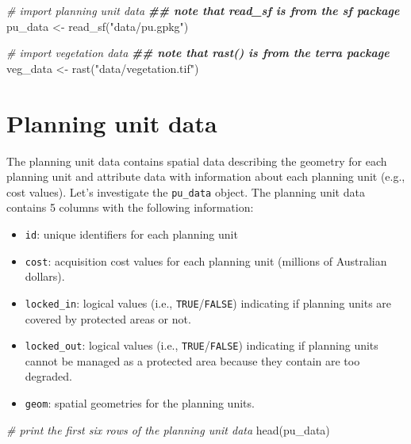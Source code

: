 \documentclass[
  12pt,
]{book}
\newenvironment{Shaded}{\begin{snugshade}}{\end{snugshade}}
\newcommand{\CommentTok}[1]{\textcolor[rgb]{0.56,0.35,0.01}{\textit{#1}}}
\newcommand{\DocumentationTok}[1]{\textcolor[rgb]{0.56,0.35,0.01}{\textbf{\textit{#1}}}}
\newcommand{\FunctionTok}[1]{\textcolor[rgb]{0.00,0.00,0.00}{#1}}
\newcommand{\NormalTok}[1]{#1}
\newcommand{\OtherTok}[1]{\textcolor[rgb]{0.56,0.35,0.01}{#1}}
\newcommand{\StringTok}[1]{\textcolor[rgb]{0.31,0.60,0.02}{#1}}
\providecommand{\tightlist}{%
  \setlength{\itemsep}{0pt}\setlength{\parskip}{0pt}}
\begin{document}
\begin{Shaded}
\begin{Highlighting}[]
\CommentTok{\# import planning unit data}
\DocumentationTok{\#\# note that read\_sf is from the sf package}
\NormalTok{pu\_data }\OtherTok{\textless{}{-}} \FunctionTok{read\_sf}\NormalTok{(}\StringTok{"data/pu.gpkg"}\NormalTok{)}

\CommentTok{\# import vegetation data}
\DocumentationTok{\#\# note that rast() is from the terra package}
\NormalTok{veg\_data }\OtherTok{\textless{}{-}} \FunctionTok{rast}\NormalTok{(}\StringTok{"data/vegetation.tif"}\NormalTok{)}
\end{Highlighting}
\end{Shaded}

\hypertarget{planning-unit-data}{%
\section{Planning unit data}\label{planning-unit-data}}

The planning unit data contains spatial data describing the geometry for each planning unit and attribute data with information about each planning unit (e.g., cost values). Let's investigate the \texttt{pu\_data} object. The planning unit data contains 5 columns with the following information:

\begin{itemize}
\tightlist
\item
  \texttt{id}: unique identifiers for each planning unit
\item
  \texttt{cost}: acquisition cost values for each planning unit (millions of Australian dollars).
\item
  \texttt{locked\_in}: logical values (i.e., \texttt{TRUE}/\texttt{FALSE}) indicating if planning units are covered by protected areas or not.
\item
  \texttt{locked\_out}: logical values (i.e., \texttt{TRUE}/\texttt{FALSE}) indicating if planning units cannot be managed as a protected area because they contain are too degraded.
\item
  \texttt{geom}: spatial geometries for the planning units.
\end{itemize}

\begin{Shaded}
\begin{Highlighting}[]
\CommentTok{\# print the first six rows of the planning unit data}
\FunctionTok{head}\NormalTok{(pu\_data)}
\end{Highlighting}
\end{Shaded}
\end{document}
